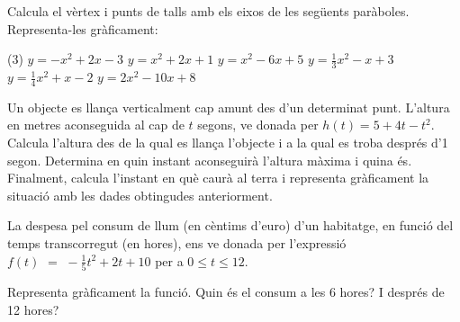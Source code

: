 \begin{mylist}
\exer Calcula el vèrtex i punts de talls amb els eixos de les següents paràboles. Representa-les gràficament:
\begin{tasks}(3)
	\task $y=-x^2+2x-3$
	\task $y=x^2+2x+1$
	\task $y=x^2-6x+5$
	\task $y=\frac{1}{3}x^2-x+3$
	\task $y=\frac{1}{4}x^2+x-2$
	\task $y=2x^2-10x+8$
\end{tasks}


\exer Un objecte es llança verticalment cap amunt des d'un determinat punt. L'altura en metres aconseguida al cap de $t$ segons, ve donada per $h(t)=5+4t-t^{2}$. Calcula l'altura des de la qual es llança l'objecte i a la qual es troba després d'1 segon. Determina en quin instant aconseguirà l'altura màxima i quina és. Finalment, calcula l'instant en què caurà al terra i representa gràficament la situació amb les dades obtingudes anteriorment.


\exer La despesa pel consum de llum (en cèntims d'euro) d'un habitatge, en funció del temps transcorregut (en hores), ens ve donada per l'expressió $f\left(t\right)\, \, =\, \, -\frac{1}{5} t^{2} +2t+10$ per a $0\le t\le 12$.

\begin{tasks}
\task Representa gràficament la funció.
\task Quin és el consum a les 6 hores? I després de 12 hores? 
\end{tasks}


\end{mylist}

